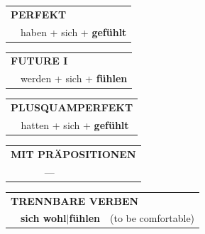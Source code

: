 \documentclass[10pt,a4paper]{revtex4-2}
\begin{document}
\begin{verbbox-acc}
 \begin{tabular}{rl}
     \multicolumn{2}{l}{\textbf{PERFEKT}}\\
    &haben + sich + \textbf{gefühlt}\\
  \end{tabular}
\hfill
   \begin{tabular}{rl}
   
    \multicolumn{2}{l}{\textbf{FUTURE I} }\\
    &werden + sich + \textbf{fühlen}\\
 
  \end{tabular}
\hfill
   \begin{tabular}{rl}
      \multicolumn{2}{l}{\textbf{PLUSQUAMPERFEKT}}\\
    &hatten + sich + \textbf{gefühlt}\\
  \end{tabular}
  
\vspace{10pt}

\begin{tabular}{lll}
\multicolumn{3}{l}{\textbf{MIT PRÄPOSITIONEN}}\\
& ---\\
\end{tabular}
  \hfill
   \begin{tabular}{lll}
      \multicolumn{3}{l}{\textbf{TRENNBARE VERBEN}}\\
     & \textbf{sich wohl$|$fühlen} & (to be comfortable)
  \end{tabular}
  
  \vspace{-5pt}

\end{verbbox-acc}
\end{document}
